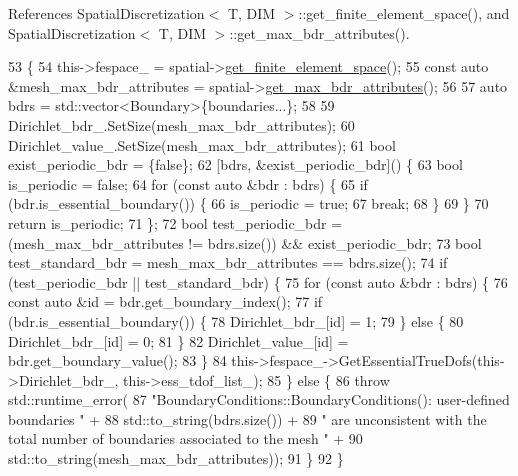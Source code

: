 References Spatial\+Discretization$<$ T, D\+I\+M $>$\+::get\+\_\+finite\+\_\+element\+\_\+space(), and Spatial\+Discretization$<$ T, D\+I\+M $>$\+::get\+\_\+max\+\_\+bdr\+\_\+attributes().


\begin{DoxyCode}
53                                                                           \{
54   this->fespace\_ = spatial->\hyperlink{classSpatialDiscretization_ac001fc2ff356fe8c0c2b49618e594a03}{get\_finite\_element\_space}();
55   \textcolor{keyword}{const} \textcolor{keyword}{auto} &mesh\_max\_bdr\_attributes = spatial->\hyperlink{classSpatialDiscretization_aa6fe6ae45f18daf5a20fbc8b49b2ef05}{get\_max\_bdr\_attributes}();
56 
57   \textcolor{keyword}{auto} bdrs = std::vector<Boundary>\{boundaries...\};
58 
59   Dirichlet\_bdr\_.SetSize(mesh\_max\_bdr\_attributes);
60   Dirichlet\_value\_.SetSize(mesh\_max\_bdr\_attributes);
61   \textcolor{keywordtype}{bool} exist\_periodic\_bdr = \{\textcolor{keyword}{false}\};
62   [bdrs, &exist\_periodic\_bdr]() \{
63     \textcolor{keywordtype}{bool} is\_periodic = \textcolor{keyword}{false};
64     \textcolor{keywordflow}{for} (\textcolor{keyword}{const} \textcolor{keyword}{auto} &bdr : bdrs) \{
65       \textcolor{keywordflow}{if} (bdr.is\_essential\_boundary()) \{
66         is\_periodic = \textcolor{keyword}{true};
67         \textcolor{keywordflow}{break};
68       \}
69     \}
70     \textcolor{keywordflow}{return} is\_periodic;
71   \};
72   \textcolor{keywordtype}{bool} test\_periodic\_bdr = (mesh\_max\_bdr\_attributes != bdrs.size()) && exist\_periodic\_bdr;
73   \textcolor{keywordtype}{bool} test\_standard\_bdr = mesh\_max\_bdr\_attributes == bdrs.size();
74   \textcolor{keywordflow}{if} (test\_periodic\_bdr || test\_standard\_bdr) \{
75     \textcolor{keywordflow}{for} (\textcolor{keyword}{const} \textcolor{keyword}{auto} &bdr : bdrs) \{
76       \textcolor{keyword}{const} \textcolor{keyword}{auto} &\textcolor{keywordtype}{id} = bdr.get\_boundary\_index();
77       \textcolor{keywordflow}{if} (bdr.is\_essential\_boundary()) \{
78         Dirichlet\_bdr\_[id] = 1;
79       \} \textcolor{keywordflow}{else} \{
80         Dirichlet\_bdr\_[id] = 0;
81       \}
82       Dirichlet\_value\_[id] = bdr.get\_boundary\_value();
83     \}
84     this->fespace\_->GetEssentialTrueDofs(this->Dirichlet\_bdr\_, this->ess\_tdof\_list\_);
85   \} \textcolor{keywordflow}{else} \{
86     \textcolor{keywordflow}{throw} std::runtime\_error(
87         \textcolor{stringliteral}{"BoundaryConditions::BoundaryConditions(): user-defined boundaries  "} +
88         std::to\_string(bdrs.size()) +
89         \textcolor{stringliteral}{" are unconsistent with the total number of boundaries associated to the mesh "} +
90         std::to\_string(mesh\_max\_bdr\_attributes));
91   \}
92 \}
\end{DoxyCode}


